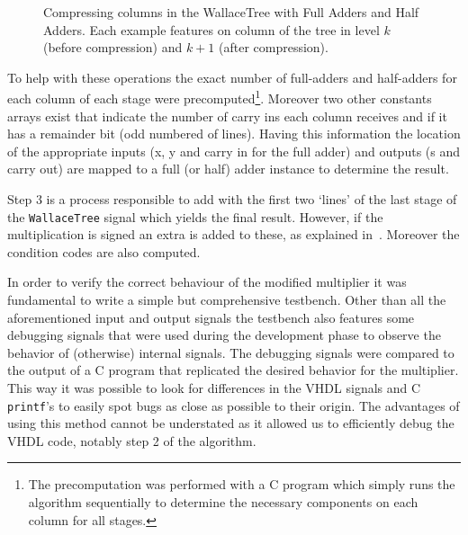 \begin{figure}[H]
\centering
{}
\caption{Compressing columns in the WallaceTree with Full Adders and Half Adders. Each example features on column of the tree in level $k$ (before compression) and $k+1$ (after compression).}
\label{fig:wt_compression}
\end{figure}


To help with these operations the exact number of full-adders and half-adders for each column of each stage were precomputed\footnote{The precomputation was performed with a C program which simply runs the algorithm sequentially to determine the necessary components on each column for all stages.}. Moreover two other constants arrays exist that indicate the number of carry ins each column receives and if it has a remainder bit (odd numbered of lines).
Having this information the location of the appropriate inputs (x, y and carry in for the full adder) and outputs (s and carry out) are mapped to a full (or half) adder instance to determine the result.

Step 3 is a process responsible to add with the first two `lines' of the last stage of the \texttt{WallaceTree} signal which yields the final result. However, if the multiplication is signed an extra \STDV is added to these, as explained in~\cite{part3}. Moreover the condition codes are also computed.


In order to verify the correct behaviour of the modified multiplier it was fundamental to write a simple but comprehensive testbench.
Other than all the aforementioned input and output signals the testbench also features some debugging signals that were used during the development phase to observe the behavior of (otherwise) internal signals. The debugging signals were compared to the output of a C program that replicated the desired behavior for the multiplier. This way it was possible to look for differences in the VHDL signals and C \texttt{printf}'s to easily spot bugs as close as possible to their origin. The advantages of using this method cannot be understated as it allowed us to efficiently debug the VHDL code, notably step 2 of the algorithm.

